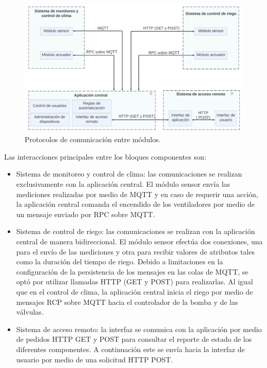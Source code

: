 \begin{figure}[h]
	\centering
	\includegraphics[width=1.0\textwidth]{./Figures/blockproto.jpeg}
	\caption[Protocolos de comunicación entre módulos.]{Protocolos de comunicación entre módulos.}
	\label{fig:blockprotos}
\end{figure}


\pagebreak
Las interacciones principales entre los bloques componentes son:
 
 \begin{itemize}
	\item Sistema de monitoreo y control de clima: las comunicaciones se realizan exclusivamente con la aplicación central.
	El módulo sensor envía las mediciones realizadas por medio de MQTT y en caso de requerir una acción, la aplicación central comanda el encendido de los ventiladores por medio de un mensaje enviado por RPC \citep{rfc1057} sobre MQTT.
	
	\item Sistema de control de riego: las comunicaciones se realizan con la aplicación central de manera bidireccional.
	El módulo sensor efectúa dos conexiones, una para el envío de las mediciones y otra para recibir valores de atributos tales como la duración del tiempo de riego. Debido a limitaciones en la configuración de la persistencia de los mensajes en las colas de MQTT, se optó por utilizar llamadas HTTP (GET y POST) para realizarlas.
	Al igual que en el control de clima, la aplicación central inicia el riego por medio de mensajes RCP sobre MQTT hacia el controlador de la bomba y de las válvulas.
	
	\item Sistema de acceso remoto: la interfaz se comunica con la aplicación por medio de pedidos HTTP GET y POST para consultar el reporte de estado de los diferentes componentes. A continuación este se envía hacia la interfaz de usuario por medio de una solicitud HTTP POST.
 
 
 
 
 \end{itemize}






